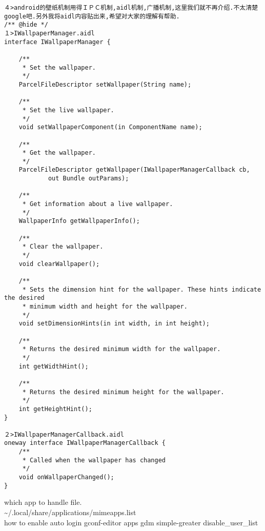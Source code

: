 \documentclass[a4paper,11pt,twoside,openany]{article}%
\begin{document}
\begin{CJK}{UTF8}{song}
\begin{verbatim}
４>android的壁纸机制用得ＩＰＣ机制,aidl机制,广播机制,这里我们就不再介绍.不太清楚google吧.另外我将aidl内容贴出来,希望对大家的理解有帮助. 
/** @hide */ 
１>IWallpaperManager.aidl 
interface IWallpaperManager { 

    /** 
     * Set the wallpaper. 
     */ 
    ParcelFileDescriptor setWallpaper(String name); 
    
    /** 
     * Set the live wallpaper. 
     */ 
    void setWallpaperComponent(in ComponentName name); 
    
    /** 
     * Get the wallpaper. 
     */ 
    ParcelFileDescriptor getWallpaper(IWallpaperManagerCallback cb, 
            out Bundle outParams); 
    
    /** 
     * Get information about a live wallpaper. 
     */ 
    WallpaperInfo getWallpaperInfo(); 
    
    /** 
     * Clear the wallpaper. 
     */ 
    void clearWallpaper(); 

    /** 
     * Sets the dimension hint for the wallpaper. These hints indicate the desired 
     * minimum width and height for the wallpaper. 
     */ 
    void setDimensionHints(in int width, in int height); 

    /** 
     * Returns the desired minimum width for the wallpaper. 
     */ 
    int getWidthHint(); 

    /** 
     * Returns the desired minimum height for the wallpaper. 
     */ 
    int getHeightHint(); 
} 

２>IWallpaperManagerCallback.aidl 
oneway interface IWallpaperManagerCallback { 
    /** 
     * Called when the wallpaper has changed 
     */ 
    void onWallpaperChanged(); 
} 

\end{verbatim}

which app to handle file.\\\indent\~{}/.local/share/applications/mimeapps.list  \\
how to enable auto login gconf-editor apps gdm simple-greater disable\_user\_list
\end{CJK}
\end{document}
